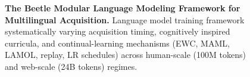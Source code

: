 















\newpage 



\newpage 
\begin{figure}[!ht]
    \centering
    \caption{\textbf{The Beetle Modular Language Modeling Framework for Multilingual Acquisition.} Language model training framework systematically varying acquisition timing, cognitively inspired curricula, and continual-learning mechanisms (EWC, MAML, LAMOL, replay, LR schedules) across human-scale (100M tokens) and web-scale (24B tokens) regimes.}
    \label{fig:placeholder}
\end{figure}


